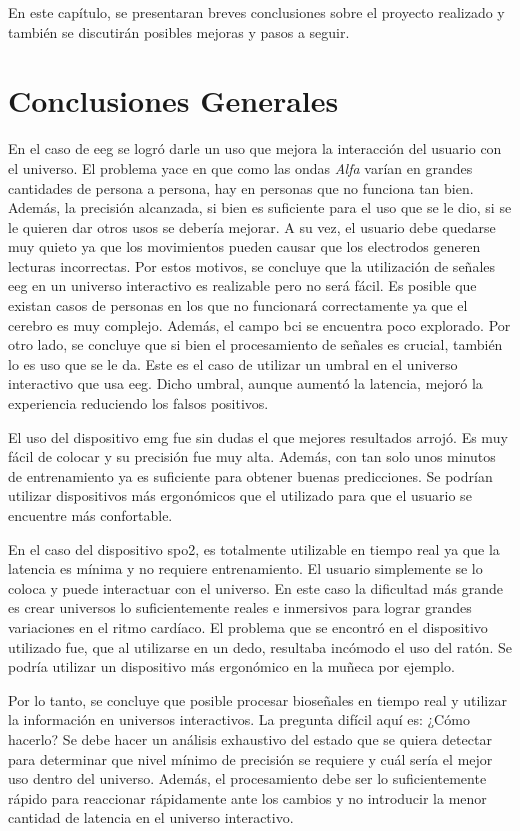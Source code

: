 En este capítulo, se presentaran breves conclusiones sobre el proyecto realizado y también se discutirán posibles mejoras y pasos a seguir.

\section{Conclusiones Generales}

En el caso de \acrshort{eeg} se logró darle un uso que mejora la interacción del usuario con el universo. El problema yace en que como las ondas \emph{Alfa} varían en grandes cantidades de persona a persona, hay en personas que no funciona tan bien. Además, la precisión alcanzada, si bien es suficiente para el uso que se le dio, si se le quieren dar otros usos se debería mejorar. A su vez, el usuario debe quedarse muy quieto ya que los movimientos pueden causar que los electrodos generen lecturas incorrectas. Por estos motivos, se concluye que la utilización de señales \acrshort{eeg} en un universo interactivo es realizable pero no será fácil. Es posible que existan casos de personas en los que no funcionará correctamente ya que el cerebro es muy complejo. Además, el campo \acrshort{bci} se encuentra poco explorado. Por otro lado, se concluye que si bien el procesamiento de señales es crucial, también lo es uso que se le da. Este es el caso de utilizar un umbral en el universo interactivo que usa \acrshort{eeg}. Dicho umbral, aunque aumentó la latencia, mejoró la experiencia reduciendo los falsos positivos.

El uso del dispositivo \acrshort{emg} fue sin dudas el que mejores resultados arrojó. Es muy fácil de colocar y su precisión fue muy alta. Además, con tan solo unos minutos de entrenamiento ya es suficiente para obtener buenas predicciones. Se podrían utilizar dispositivos más ergonómicos que el utilizado para que el usuario se encuentre más confortable.

En el caso del dispositivo \acrshort{spo2}, es totalmente utilizable en tiempo real ya que la latencia es mínima y no requiere entrenamiento. El usuario simplemente se lo coloca y puede interactuar con el universo. En este caso la dificultad más grande es crear universos lo suficientemente reales e inmersivos para lograr grandes variaciones en el ritmo cardíaco. El problema que se encontró en el dispositivo utilizado fue, que al utilizarse en un dedo, resultaba incómodo el uso del ratón. Se podría utilizar un dispositivo más ergonómico en la muñeca por ejemplo.

Por lo tanto, se concluye que posible procesar bioseñales en tiempo real y utilizar la información en universos interactivos. La pregunta difícil aquí es: ¿Cómo hacerlo? Se debe hacer un análisis exhaustivo del estado que se quiera detectar para determinar que nivel mínimo de precisión se requiere y cuál sería el mejor uso dentro del universo. Además, el procesamiento debe ser lo suficientemente rápido para reaccionar rápidamente ante los cambios y no introducir la menor cantidad de latencia en el universo interactivo.

